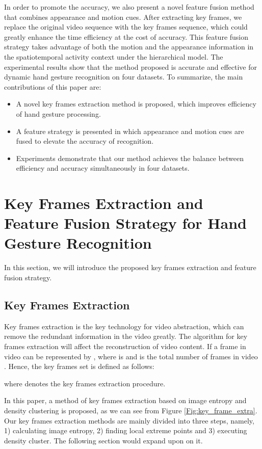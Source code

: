 \documentclass[5p]{elsarticle}
\begin{document}
In order to promote the accuracy, we also present a novel feature fusion method that combines appearance and motion cues.
After extracting key frames, we replace the original video sequence with the key frames sequence, which could greatly enhance the time efficiency at the cost of accuracy.
This feature fusion strategy takes advantage of both the motion and the appearance information in the spatiotemporal activity context under the hierarchical model.
The experimental results show that
the method proposed is accurate and effective for dynamic hand gesture recognition on four datasets.
To summarize, the main contributions of this paper are:
\begin{itemize}
	\item A novel key frames extraction method is proposed, which improves efficiency of hand gesture processing.
	\item A feature strategy is presented in which appearance and motion cues are fused to elevate the accuracy of recognition.
	\item Experiments demonstrate that our method achieves the balance between efficiency and accuracy simultaneously in four datasets.
\end{itemize}

\section{Key Frames Extraction and Feature Fusion Strategy for Hand Gesture Recognition}
\label{sec:propo}
In this section, we will introduce the proposed key frames extraction and feature fusion strategy.
\subsection{Key Frames Extraction}
Key frames extraction is the key technology for video abstraction, which can remove the redundant information in the video greatly.
The algorithm for key frames extraction will affect the reconstruction of video content.
If a frame in video  can be represented by , where  is  and  is the total number of frames in video .
Hence, the key frames set  is defined as follows:

where  denotes the key frames extraction procedure.

In this paper, a method of key frames extraction based on image entropy and density clustering is proposed, as we can see from Figure \ref{Fig:key_frame_extra}.
Our key frames extraction methods are mainly divided into three steps, namely, 1) calculating image entropy, 2) finding local extreme points and 3) executing density cluster.
The following section would expand upon on it.
\end{document}
